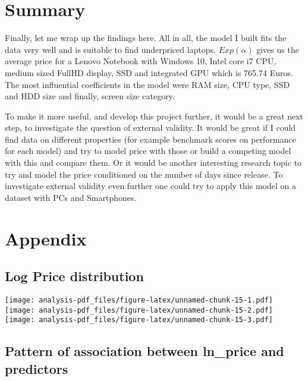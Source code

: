 \documentclass[
]{article}
\begin{document}
\hypertarget{summary}{%
\section{Summary}\label{summary}}

Finally, let me wrap up the findings here. All in all, the model I built
fits the data very well and is suitable to find underpriced laptops.
\(Exp(\alpha)\) gives us the average price for a Lenovo Notebook with
Windows 10, Intel core i7 CPU, medium sized FullHD display, SSD and
integrated GPU which is 765.74 Euros. The most influential coefficients
in the model were RAM size, CPU type, SSD and HDD size and finally,
screen size category.

To make it more useful, and develop this project further, it would be a
great next step, to investigate the question of external validity. It
would be great if I could find data on different properties (for example
benchmark scores on performance for each model) and try to model price
with those or build a competing model with this and compare them. Or it
would be another interesting research topic to try and model the price
conditioned on the number of days since release. To investigate external
validity even further one could try to apply this model on a dataset
with PCs and Smartphones.

\hypertarget{appendix}{%
\section{Appendix}\label{appendix}}

\hypertarget{log-price-distribution}{%
\subsection{Log Price distribution}\label{log-price-distribution}}

\texttt{[image: analysis-pdf\_files/figure-latex/unnamed-chunk-15-1.pdf]}
\texttt{[image: analysis-pdf\_files/figure-latex/unnamed-chunk-15-2.pdf]}
\texttt{[image: analysis-pdf\_files/figure-latex/unnamed-chunk-15-3.pdf]}

\hypertarget{pattern-of-association-between-ln_price-and-predictors}{%
\subsection{Pattern of association between ln\_price and
predictors}\label{pattern-of-association-between-ln_price-and-predictors}}
\end{document}
